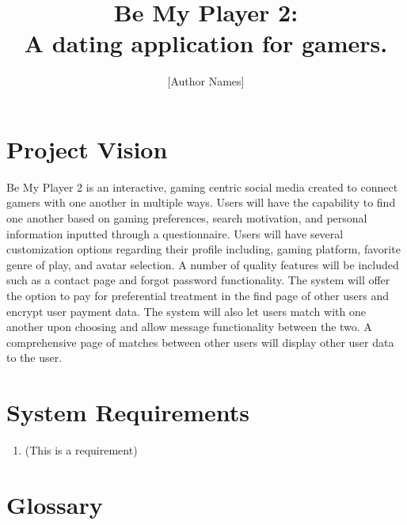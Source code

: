 \documentclass[10pt, draft]{article}
\title{Be My Player 2: \\ A dating application for gamers.}
\author{[Author Names]}
\begin{document}
\maketitle \pagebreak



\section{Project Vision}
Be My Player 2 is an interactive, gaming centric social media created to connect gamers with one another in multiple ways. Users will have the capability to find one another based on gaming preferences, search motivation, and personal information inputted through a questionnaire. Users will have several customization options regarding their profile including, gaming platform, favorite genre of play, and avatar selection. A number of quality features will be included such as a contact page and forgot password functionality. The system will offer the option to pay for preferential treatment in the find page of other users and encrypt user payment data. The system will also let users match with one another upon choosing and allow message functionality between the two. A comprehensive page of matches between other users will display other user data to the user. 

\section{System Requirements}
\begin{enumerate}
\item (This is a requirement)
\end{enumerate}

\section{Glossary}
\end{document}

